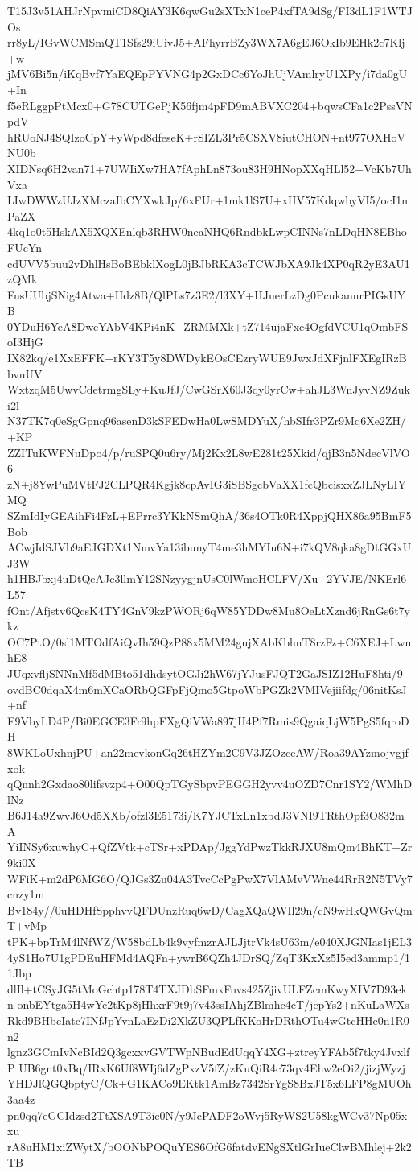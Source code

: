 T15J3v51AHJrNpvmiCD8QiAY3K6qwGu2sXTxN1ceP4xfTA9dSg/FI3dL1F1WTJOs
rr8yL/IGvWCMSmQT1Sfs29iUivJ5+AFhyrrBZy3WX7A6gEJ6OkIb9EHk2c7Klj+w
jMV6Bi5n/iKqBvf7YaEQEpPYVNG4p2GxDCc6YoJhUjVAmlryU1XPy/i7da0gU+In
f5eRLggpPtMcx0+G78CUTGePjK56fjm4pFD9mABVXC204+bqwsCFa1c2PssVNpdV
hRUoNJ4SQIzoCpY+yWpd8dfeseK+rSIZL3Pr5CSXV8iutCHON+nt977OXHoVNU0b
XIDNsq6H2van71+7UWIiXw7HA7fAphLn873ou83H9HNopXXqHLl52+VcKb7UhVxa
LIwDWWzUJzXMczaIbCYXwkJp/6xFUr+1mk1lS7U+xHV57KdqwbyVI5/ocI1nPaZX
4kq1o0t5HskAX5XQXEnlqb3RHW0neaNHQ6RndbkLwpCINNs7nLDqHN8EBhoFUcYn
cdUVV5buu2vDhlHsBoBEbklXogL0jBJbRKA3cTCWJbXA9Jk4XP0qR2yE3AU1zQMk
FnsUUbjSNig4Atwa+Hdz8B/QlPLs7z3E2/l3XY+HJuerLzDg0PcukannrPIGsUYB
0YDuH6YeA8DwcYAbV4KPi4nK+ZRMMXk+tZ714ujaFxc4OgfdVCU1qOmbFSoI3HjG
IX82kq/e1XxEFFK+rKY3T5y8DWDykEOsCEzryWUE9JwxJdXFjnlFXEgIRzBbvuUV
WxtzqM5UwvCdetrmgSLy+KuJfJ/CwGSrX60J3qy0yrCw+ahJL3WnJyvNZ9Zuki2l
N37TK7q0eSgGpnq96asenD3kSFEDwHa0LwSMDYuX/hbSIfr3PZr9Mq6Xe2ZH/+KP
ZZITuKWFNuDpo4/p/ruSPQ0u6ry/Mj2Kx2L8wE281t25Xkid/qjB3n5NdecVlVO6
zN+j8YwPuMVtFJ2CLPQR4Kgjk8cpAvIG3iSBSgcbVaXX1fcQbcisxxZJLNyLIYMQ
SZmIdIyGEAihFi4FzL+EPrrc3YKkNSmQhA/36s4OTk0R4XppjQHX86a95BmF5Bob
ACwjIdSJVb9aEJGDXt1NmvYa13ibunyT4me3hMYIu6N+i7kQV8qka8gDtGGxUJ3W
h1HBJbxj4uDtQeAJc3llmY12SNzyygjnUsC0lWmoHCLFV/Xu+2YVJE/NKErl6L57
fOnt/Afjstv6QcsK4TY4GnV9kzPWORj6qW85YDDw8Mu8OeLtXznd6jRnGs6t7ykz
OC7PtO/0sl1MTOdfAiQvIh59QzP88x5MM24gujXAbKbhnT8rzFz+C6XEJ+LwnhE8
JUqxvfljSNNnMf5dMBto51dhdsytOGJi2hW67jYJusFJQT2GaJSIZ12HuF8hti/9
ovdBC0dqaX4m6mXCaORbQGFpFjQmo5GtpoWbPGZk2VMIVejiifdg/06nitKsJ+nf
E9VbyLD4P/Bi0EGCE3Fr9hpFXgQiVWa897jH4Pf7Rmis9QgaiqLjW5PgS5fqroDH
8WKLoUxhnjPU+an22mevkonGq26tHZYm2C9V3JZOzceAW/Roa39AYzmojvgjfxok
qQnnh2Gxdao80lifsvzp4+O00QpTGySbpvPEGGH2yvv4uOZD7Cnr1SY2/WMhDlNz
B6J14a9ZwvJ6Od5XXb/ofzl3E5173i/K7YJCTxLn1xbdJ3VNI9TRthOpf3O832mA
YiINSy6xuwhyC+QfZVtk+cTSr+xPDAp/JggYdPwzTkkRJXU8mQm4BhKT+Zr9ki0X
WFiK+m2dP6MG6O/QJGs3Zu04A3TvcCcPgPwX7VlAMvVWne44RrR2N5TVy7cnzy1m
Bv184y//0uHDHfSpphvvQFDUnzRuq6wD/CagXQaQWIl29n/cN9wHkQWGvQmT+vMp
tPK+bpTrM4lNfWZ/W58bdLb4k9vyfmzrAJLJjtrVk4sU63m/e040XJGNIas1jEL3
4yS1Ho7U1gPDEuHFMd4AQFn+ywrB6QZh4JDrSQ/ZqT3KxXz5I5ed3ammp1/11Jbp
dlIl+tCSyJG5tMoGchtp178T4TXJDbSFmxFnvs425ZjivULFZcmKwyXIV7D93ekn
onbEYtga5H4wYc2tKp8jHhxrF9t9j7v43ssIAhjZBlmhc4cT/jepYs2+nKuLaWXs
Rkd9BHbcIatc7INfJpYvnLaEzDi2XkZU3QPLfKKoHrDRthOTu4wGtcHHc0n1R0n2
lgnz3GCmIvNcBId2Q3gcxxvGVTWpNBudEdUqqY4XG+ztreyYFAb5f7tky4JvxlfP
UB6gnt0xBq/IRxK6Uf8WIj6dZgPxzV5fZ/zKuQiR4c73qv4Ehw2eOi2/jizjWyzj
YHDJlQGQbptyC/Ck+G1KACo9EKtk1AmBz7342SrYgS8BxJT5x6LFP8gMUOh3aa4z
pn0qq7eGCIdzsd2TtXSA9T3ic0N/y9JcPADF2oWvj5RyWS2U58kgWCv37Np05xxu
rA8uHM1xiZWytX/bOONbPOQuYES6OfG6fatdvENgSXtlGrIueClwBMhlej+2k2TB
